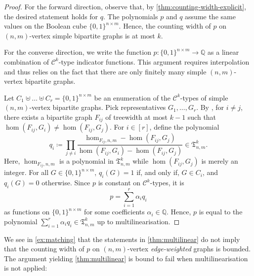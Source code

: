 \documentclass[10pt,a4paper]{article}
\theoremstyle{definition}
\theoremstyle{plain}
\theoremstyle{remark}
\begin{document}
	\begin{proof}
		For the forward direction, observe that, by \cref{thm:counting-width-explicit},
		the desired statement holds for $q$.
		The polynomials $p$ and $q$ assume the same values on the Boolean cube $\{0,1\}^{n \times m}$.
		Hence, the counting width of $p$ on $(n,m)$-vertex simple bipartite graphs is at most $k$.
		
		For the converse direction,
		we write the function $p \colon \{0,1\}^{n\times m} \to \mathbb{Q}$ as a linear combination of $\mathcal{C}^k$-type indicator functions.
		This argument requires interpolation and thus relies on the fact that there are only finitely many simple $(n,m)$-vertex bipartite graphs.
		
		Let $C_1 \uplus \dots \uplus C_r = \{0,1\}^{n\times m}$ be an enumeration of the $\mathcal{C}^k$-types of simple $(n,m)$-vertex bipartite graphs.
		Pick representatives $G_1, \dots, G_r$.
		By \cite{dvorak_recognizing_2010},
		for $i \neq j$, there  exists a bipartite graph $F_{ij}$ of treewidth at most $k-1$ such that $\hom(F_{ij}, G_i) \neq \hom(F_{ij}, G_j)$.
		For $i \in [r]$, define the polynomial
		\[
			q_i\coloneqq \prod_{j \neq i} \frac{\hom_{F_{ij}, n,m} - \hom(F_{ij}, G_j)}{\hom(F_{ij}, G_i) - \hom(F_{ij}, G_j)} \in \mathfrak{T}^k_{n,m}.
		\]
		Here, $\hom_{F_{ij}, n,m}$ is a polynomial in $\mathfrak{T}^k_{n,m}$ while $\hom(F_{ij}, G_j)$ is merely an integer.
		For all $G \in \{0,1\}^{n\times m}$, $q_i(G) = 1$ if, and only if, $G \in C_i$, and $q_i(G) =0$ otherwise.
		Since $p$ is constant on $\mathcal{C}^k$-types,
		it is
		\[
			p = \sum_{i=1}^r \alpha_i q_i
		\]
		as functions on $\{0,1\}^{n\times m}$ for some coefficients $\alpha_i \in \mathbb{Q}$.
		Hence, $p$ is equal to the polynomial $\sum_{i=1}^r \alpha_i q_i \in \mathfrak{T}^k_{n,m}$ up to multilinearisation.
	\end{proof}
	We see in \cref{ex:matching} that the statements in \cref{thm:multilinear} do not imply that the counting width of $p$ on $(n,m)$-vertex \emph{edge-weighted} graphs is bounded.
	The argument yielding \cref{thm:multilinear} is bound to fail when multilinearisation is not applied:
\end{document}
